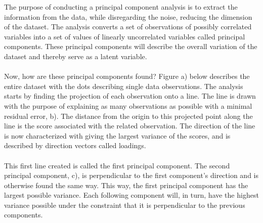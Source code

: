The purpose of conducting a principal component analysis is to extract the information from the data, while disregarding the noise, reducing the dimension of the dataset. The analysis converts a set of observations of possibly correlated variables into a set of values of linearly uncorrelated variables called principal components. These principal components will describe the overall variation of the dataset and thereby serve as a latent variable. 
\\\\
Now, how are these principal components found? Figure a) below describes the entire dataset with the dots describing single data observations. The analysis starts by finding the projection of each observation onto a line. The line is drawn with the purpose of explaining as many observations as possible with a minimal residual error, b). The distance from the origin to this projected point along the line is the score associated with the related observation. The direction of the line is now characterized with giving the largest variance of the scores, and is described by direction vectors called loadings. 
\\\\
This first line created is called the first principal component. The second principal component, c), is perpendicular to the first component’s direction and is otherwise found the same way. This way, the first principal component has the largest possible variance. Each following component will, in turn, have the highest variance possible under the constraint that it is perpendicular to the previous components. 

